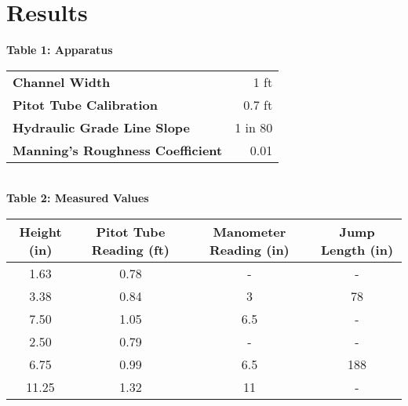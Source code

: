 \documentclass{article}
\begin{document}
\section{Results} 
\begin{center}

    {\large{\bf Table 1: Apparatus\\}}
    \vspace{3mm} 
    \begin{tabular}{|l|r|}
        \hline 
        \textbf{Channel Width} & 1 ft \\ 
        \textbf{Pitot Tube Calibration} & 0.7 ft \\ 
        \textbf{Hydraulic Grade Line Slope} & 1 in 80 \\ 
        \textbf{Manning's Roughness Coefficient} & 0.01 \\
        \hline
    \end{tabular}
    \vspace{10mm}
    {\large{\bf \\Table 2: Measured Values\\}}
    \vspace{3mm}
    \begin{tabular}{|cccc|} 
        \hline
        \textbf{Height (in)} & \textbf{Pitot Tube Reading (ft)} & \textbf{Manometer Reading (in)} & \textbf{Jump Length (in)}  \\ 
        \hline
        1.63                 & 0.78                             & -                        & -                          \\
        3.38                 & 0.84                             & 3                      & 78                         \\
        7.50                 & 1.05                             & 6.5                        & -                          \\
        2.50                 & 0.79                             & -                         & -                          \\
        6.75                 & 0.99                             & 6.5                         & 188                        \\
        11.25                & 1.32                             & 11                         & -                          \\
        \hline
    \end{tabular}

\end{center}
\end{document}

